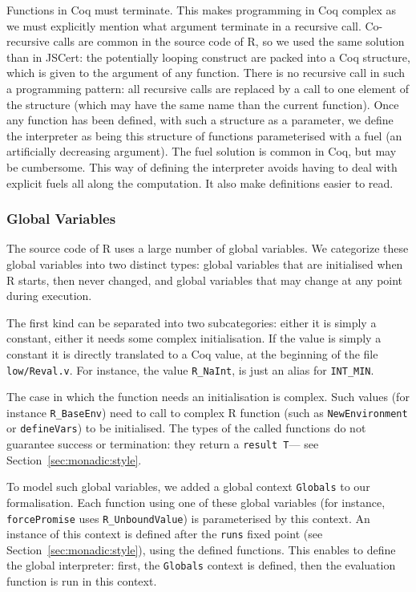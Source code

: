 \documentclass{article}
\newcommand\Coq{Coq}
\newcommand\R{R}
\begin{document}
Functions in \Coq{} must terminate.
This makes programming in \Coq{} complex as we must explicitly
mention what argument terminate in a recursive call.
Co-recursive calls are common in the source code of \R{},
so we used the same solution than in JSCert:
the potentially looping construct are packed into a \Coq{}
structure, which is given to the argument of any function.
There is no recursive call in such a programming pattern:
all recursive calls are replaced by a call to one element
of the structure (which may have the same name than the
current function).
Once any function has been defined,
with such a structure as a parameter,
we define the interpreter as being this structure of functions
parameterised with a fuel (an artificially decreasing argument).
The fuel solution is common in \Coq{},
but may be cumbersome.
This way of defining the interpreter avoids
having to deal with explicit fuels all along the computation.
It also make definitions easier to read.


\subsubsection{Global Variables}

The source code of \R{} uses a large number of global variables.
We categorize these global variables into two distinct types:
global variables that are initialised when \R{} starts, then never changed,
and global variables that may change at any point during execution.

The first kind can be separated into two subcategories:
either it is simply a constant, either it needs some complex initialisation.
If the value is simply a constant
it is directly translated to a \Coq{} value,
at the beginning of the file \texttt{low/Reval.v}.
For instance, the value \texttt{R_NaInt},
is just an alias for \texttt{INT_MIN}.

The case in which the function needs an initialisation is complex.
Such values (for instance \texttt{R_BaseEnv})
need to call to complex \R{} function
(such as \texttt{NewEnvironment} or \texttt{defineVars})
to be initialised.
The types of the called functions do not guarantee success or termination:
they return a \texttt{result T}—%
see Section~\ref{sec:monadic:style}.

To model such global variables,
we added a global context \texttt{Globals} to our formalisation.
Each function using one of these global variables
(for instance, \texttt{forcePromise}
uses \texttt{R_UnboundValue})
is parameterised by this context.
An instance of this context is defined after the \texttt{runs}
fixed point (see Section~\ref{sec:monadic:style}),
using the defined functions.
This enables to define the global interpreter:
first, the \texttt{Globals} context is defined,
then the evaluation function is run in this context.
\end{document}
